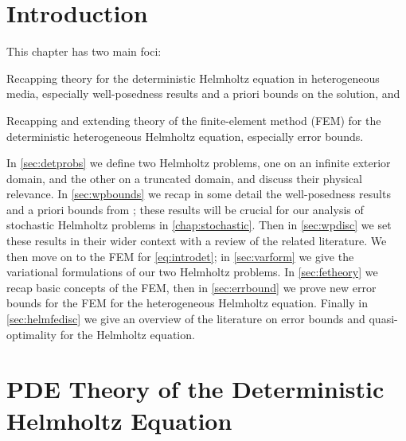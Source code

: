\section{Introduction}
This chapter has two main foci:
\ben
\item Recapping theory for the deterministic Helmholtz equation in heterogeneous media, especially well-posedness results and a priori bounds on the solution, and
\item Recapping and extending theory of the finite-element method (FEM) for the deterministic heterogeneous Helmholtz equation, especially error bounds.
  \een


In \cref{sec:detprobs} we  define two Helmholtz problems, one on an infinite exterior domain, and the other on a truncated domain, and discuss their physical relevance. In \cref{sec:wpbounds} we  recap in some detail the well-posedness results and a priori bounds from \cite{GrPeSp:19}; these results will be crucial for our analysis of stochastic Helmholtz problems in \cref{chap:stochastic}. Then in \cref{sec:wpdisc} we set these results in their wider context with a review of the related literature. We  then move on to the FEM for \eqref{eq:introdet}; in \cref{sec:varform} we give the variational formulations of our two Helmholtz problems. In \cref{sec:fetheory} we recap basic concepts of the FEM, then in \cref{sec:errbound} we  prove new error bounds for the FEM for the heterogeneous Helmholtz equation. Finally in \cref{sec:helmfedisc} we  give an overview of the literature on error bounds and quasi-optimality for the Helmholtz equation.


\section{PDE Theory of the Deterministic Helmholtz Equation}
  


